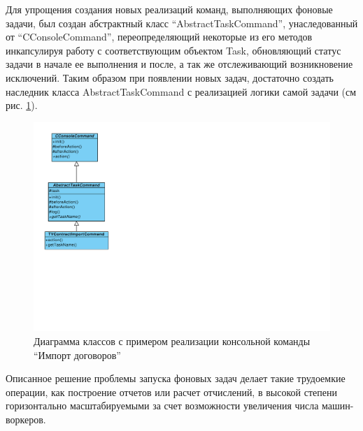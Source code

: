 Для упрощения создания новых реализаций команд, выполняющих фоновые задачи, был создан абстрактный класс
``AbstractTaskCommand'', унаследованный от ``CConsoleCommand'', переопределяющий некоторые из его методов
инкапсулируя работу с соответствующим объектом Task, обновляющий статус задачи в начале ее выполнения и после,
а так же отслеживающий возникновение исключений.
Таким образом при появлении новых задач, достаточно создать наследник класса AbstractTaskCommand с реализацией
логики самой задачи (см рис. \ref{gr:tasks_class}).

\begin{figure}[!ht]
\begin{center}
\vspace{-0.5cm}
\includegraphics[scale=0.7, trim=10mm 81mm 200mm 10mm, clip]{../resources/uml/AbstractTask.pdf}
\caption{Диаграмма классов с примером реализации консольной команды ``Импорт договоров''}
\label{gr:tasks_class}
\end{center}
\end{figure} 

Описанное решение проблемы запуска фоновых задач делает такие трудоемкие операции, как построение отчетов
или расчет отчислений, в высокой степени горизонтально масштабируемыми за счет возможности увеличения
числа машин-воркеров.

